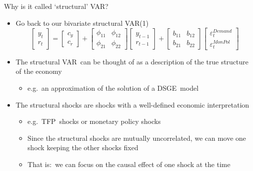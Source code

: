 \documentclass[10pt,handout]{beamer}
\begin{document}
\begin{frame}
{Why is it called `structural' VAR?}
\begin{itemize}
\item Go back to our bivariate structural VAR(1)
\begin{equation*}
\begin{bmatrix}
y_{t} \\
r_{t}%
\end{bmatrix}%
=%
\begin{bmatrix}
c_{y} \\
c_{r}%
\end{bmatrix}%
+%
\begin{bmatrix}
\phi _{11} & \phi _{12} \\
\phi _{21} & \phi _{22}%
\end{bmatrix}%
\begin{bmatrix}
y_{t-1} \\
r_{t-1}%
\end{bmatrix}%
+%
\begin{bmatrix}
b_{11} & b_{12} \\
b_{21} & b_{22}%
\end{bmatrix}%
\begin{bmatrix}
\varepsilon_{t}^{Demand} \\
\varepsilon_{t}^{MonPol}%
\end{bmatrix}%
\end{equation*}
\item The structural VAR\ can be thought of as a description of the true structure of the economy \smallskip
\begin{itemize}
\item e.g.\ an approximation of the solution of a DSGE\ model \medskip
\end{itemize}
\item The structural shocks are shocks with a well-defined economic interpretation \smallskip
\begin{itemize}
\item e.g.\ TFP\ shocks or monetary policy shocks \smallskip
\item Since the structural shocks are mutually uncorrelated, we can move one shock keeping the other shocks fixed \smallskip
\item That is:\ we can focus on the causal effect of one shock at the time \medskip
\end{itemize}
\end{itemize}
\end{frame}
\shownotesblock{}
\end{document}
